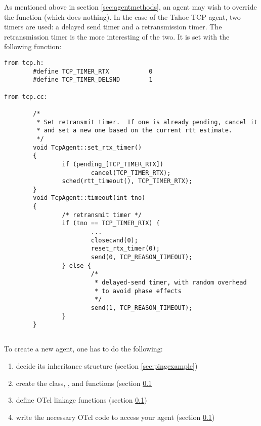As mentioned above in section \ref{sec:agentmethods}, an agent
may wish to override the  function (which does
nothing).
In the case of the Tahoe TCP agent, two timers are used: a delayed
send timer and a retransmission timer.
The retransmission timer is the more interesting of the two.
It is set with the following function:
\begin{small}
\begin{verbatim}
from tcp.h:
        #define TCP_TIMER_RTX           0
        #define TCP_TIMER_DELSND        1

from tcp.cc:

        /*
         * Set retransmit timer.  If one is already pending, cancel it
         * and set a new one based on the current rtt estimate.
         */
        void TcpAgent::set_rtx_timer()
        {
                if (pending_[TCP_TIMER_RTX])
                        cancel(TCP_TIMER_RTX);
                sched(rtt_timeout(), TCP_TIMER_RTX);
        }
        void TcpAgent::timeout(int tno)
        {
                /* retransmit timer */
                if (tno == TCP_TIMER_RTX) {
                        ...
                        closecwnd(0);
                        reset_rtx_timer(0);
                        send(0, TCP_REASON_TIMEOUT);
                } else {
                        /*
                         * delayed-send timer, with random overhead
                         * to avoid phase effects
                         */
                        send(1, TCP_REASON_TIMEOUT);
                }
        }

\end{verbatim}
\end{small}

\subsection{}

To create a new agent, one has to do the following:
\begin{enumerate}
        \item decide its inheritance structure (section \ref{sec:pingexample})
        \item create the class, , and  functions (section \ref{}
        \item define OTcl linkage functions (section \ref{})
        \item write the necessary OTcl code to access your agent (section \ref{})
\end{enumerate}

